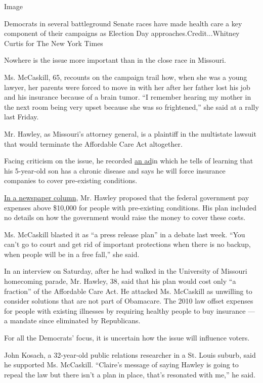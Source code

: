 Image

Democrats in several battleground Senate races have made health care a
key component of their campaigns as Election Day
approaches.Credit...Whitney Curtis for The New York Times

Nowhere is the issue more important than in the close race in Missouri.

Ms. McCaskill, 65, recounts on the campaign trail how, when she was a
young lawyer, her parents were forced to move in with her after her
father lost his job and his insurance because of a brain tumor. ``I
remember hearing my mother in the next room being very upset because she
was so frightened,'' she said at a rally last Friday.

Mr. Hawley, as Missouri's attorney general, is a plaintiff in the
multistate lawsuit that would terminate the Affordable Care Act
altogether.

Facing criticism on the issue, he recorded
\href{https://www.youtube.com/watch?v=XKpY8PCut2A}{an ad}in which he
tells of learning that his 5-year-old son has a chronic disease and says
he will force insurance companies to cover pre-existing conditions.

\href{https://www.news-leader.com/story/opinion/2018/10/03/josh-hawley-obamacare-isnt-needed-protect-preexisting-conditions/1508838002/}{In
a newspaper column}, Mr. Hawley proposed that the federal government pay
expenses above \$10,000 for people with pre-existing conditions. His
plan included no details on how the government would raise the money to
cover these costs.

Ms. McCaskill blasted it as ``a press release plan'' in a debate last
week. ``You can't go to court and get rid of important protections when
there is no backup, when people will be in a free fall,'' she said.

In an interview on Saturday, after he had walked in the University of
Missouri homecoming parade, Mr. Hawley, 38, said that his plan would
cost only ``a fraction'' of the Affordable Care Act. He attacked Ms.
McCaskill as unwilling to consider solutions that are not part of
Obamacare. The 2010 law offset expenses for people with existing
illnesses by requiring healthy people to buy insurance --- a mandate
since eliminated by Republicans.

For all the Democrats' focus, it is uncertain how the issue will
influence voters.

John Kosach, a 32-year-old public relations researcher in a St. Louis
suburb, said he supported Ms. McCaskill. ``Claire's message of saying
Hawley is going to repeal the law but there isn't a plan in place,
that's resonated with me,'' he said.

